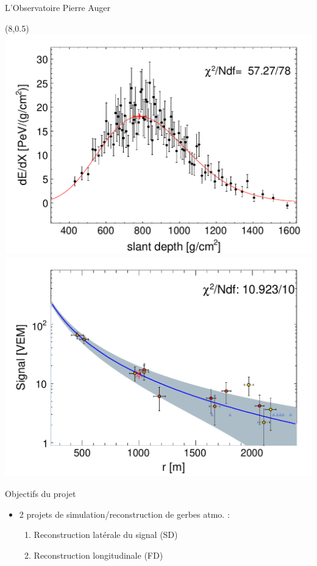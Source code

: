 \documentclass[t, compress]{beamer}
\begin{document}
\begin{frame}[c, fragile]{L'Observatoire Pierre Auger}
  \begin{textblock}{6}(8,0.5)
    \includegraphics[scale=0.32]{figures/gh}\\
    \includegraphics[scale=0.32]{figures/ldf}
  \end{textblock}

\end{frame}

\begin{frame}[c, fragile]{Objectifs du projet}

  \begin{itemize}

  \item 2 projets de simulation/reconstruction de gerbes
    atmo. :

    \begin{enumerate}

    \item Reconstruction latérale du signal (SD)

    \item Reconstruction longitudinale (FD)

    \end{enumerate}

  \end{itemize}

\end{frame}
\end{document}
